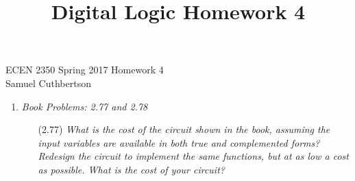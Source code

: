 \documentclass[12pt]{article}
\begin{document}
\title{Digital Logic Homework 4}

ECEN 2350 Spring 2017 \hfill Homework 4\\
Samuel Cuthbertson

\hrulefill

\begin{enumerate}
	\vspace{-4mm}
	\item \textit{Book Problems: 2.77 and 2.78}
	      \begin{enumerate}

	      	\item[(2.77)] \textit{What is the cost of the circuit shown in the book, assuming the input variables are available in both true and complemented forms? Redesign the circuit to implement the same functions, but at as low a cost as possible. What is the cost of your circuit?}


\end{enumerate}
\end{enumerate}
\end{document}

